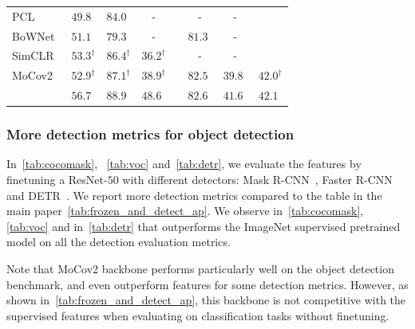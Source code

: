 \begin{table}[h]
\begin{tabular}{ @{} l ccc c ccc @{} }
	    PCL~\cite{li2020prototypical} & $49.8^{\phantom{\dagger}}$ & $84.0^{\phantom{\dagger}}$ & - && - & - \\
	    BoWNet~\cite{gidaris2020learning} & $51.1^{\phantom{\dagger}}$ & $79.3^{\phantom{\dagger}}$ & - && $81.3^{\phantom{\dagger}}$ & - \\
	    SimCLR~\cite{chen2020simple} & $53.3^{\dagger}$ & $86.4^{\dagger}$ & $36.2^{\dagger}$ && - & - \\
	    MoCov2~\cite{he2019momentum} & $52.9^{\dagger}$ & $87.1^{\dagger}$ & $38.9^{\dagger}$ && $82.5^{\phantom{\dagger}}$ & $39.8^{\phantom{\dagger}}$ & $42.0^{\dagger}$ \\
      \midrule
	    \OURS  & $\mathbf{56.7}^{\phantom{\dagger}}$ & $\mathbf{88.9}^{\phantom{\dagger}}$ & $\mathbf{48.6}^{\phantom{\dagger}}$ && $\mathbf{82.6}^{\phantom{\dagger}}$ & $\mathbf{41.6}^{\phantom{\dagger}}$ & $\mathbf{42.1}^{\phantom{\dagger}}$ \\
      \bottomrule
    \end{tabular}
\end{table}

\subsubsection{More detection metrics for object detection}
In~\cref{tab:cocomask}, ~\cref{tab:voc} and~\cref{tab:detr}, we evaluate the features by finetuning a ResNet-$50$ with different detectors: Mask R-CNN~\cite{he2017mask}, Faster R-CNN~\cite{ren2015faster} and DETR~\cite{carion2020end}.
We report more detection metrics compared to the table in the main paper~\cref{tab:frozen_and_detect_ap}.
We observe in~\cref{tab:cocomask}, \cref{tab:voc} and in~\cref{tab:detr} that \OURS outperforms the ImageNet supervised pretrained model on all the detection evaluation metrics.

Note that MoCov2 backbone performs particularly well on the object detection benchmark, and even outperform \OURS features for some detection metrics.
However, as shown in~\cref{tab:frozen_and_detect_ap}, this backbone is not competitive with the supervised features when evaluating on classification tasks without finetuning.

